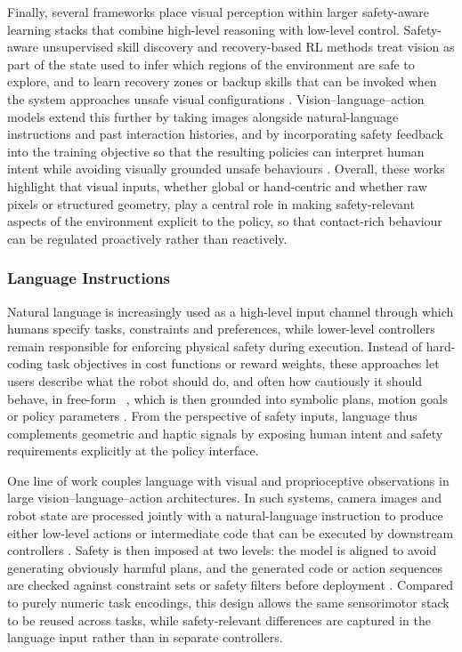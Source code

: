 \documentclass[Afour,sageh,times]{template/sagej}
\begin{document}
Finally, several frameworks place visual perception within larger safety-aware learning stacks that combine high-level reasoning with low-level control. Safety-aware unsupervised skill discovery and recovery-based RL methods treat vision as part of the state used to infer which regions of the environment are safe to explore, and to learn recovery zones or backup skills that can be invoked when the system approaches unsafe visual configurations \citep{22,91,94}. Vision–language–action models extend this further by taking images alongside natural-language instructions and past interaction histories, and by incorporating safety feedback into the training objective so that the resulting policies can interpret human intent while avoiding visually grounded unsafe behaviours \citep{33}. Overall, these works highlight that visual inputs, whether global or hand-centric and whether raw pixels or structured geometry, play a central role in making safety-relevant aspects of the environment explicit to the policy, so that contact-rich behaviour can be regulated proactively rather than reactively.

\subsubsection{Language Instructions}

Natural language is increasingly used as a high-level input channel through which humans specify tasks, constraints and preferences, while lower-level controllers remain responsible for enforcing physical safety during execution. Instead of hard-coding task objectives in cost functions or reward weights, these approaches let users describe what the robot should do, and often how cautiously it should behave, in free-form ~\citep{kyaw_text_2025}, which is then grounded into symbolic plans, motion goals or policy parameters \citep{8,33,51}. From the perspective of safety inputs, language thus complements geometric and haptic signals by exposing human intent and safety requirements explicitly at the policy interface.

One line of work couples language with visual and proprioceptive observations in large vision–language–action architectures. In such systems, camera images and robot state are processed jointly with a natural-language instruction to produce either low-level actions or intermediate code that can be executed by downstream controllers \citep{8,33}. Safety is then imposed at two levels: the model is aligned to avoid generating obviously harmful plans, and the generated code or action sequences are checked against constraint sets or safety filters before deployment \citep{8,33}. Compared to purely numeric task encodings, this design allows the same sensorimotor stack to be reused across tasks, while safety-relevant differences are captured in the language input rather than in separate controllers.
\end{document}
